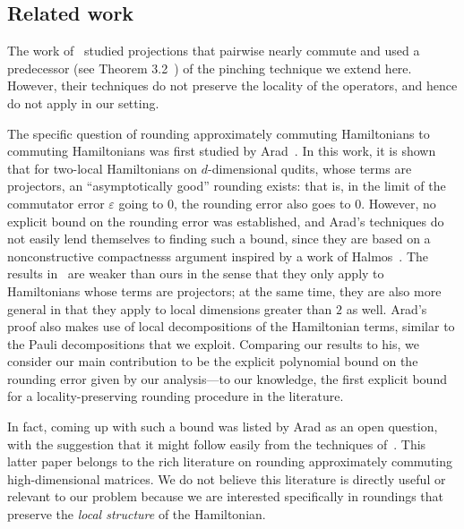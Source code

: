 \documentclass[11pt]{article}
\theoremstyle{plain}
\newcommand{\eps}{\varepsilon}
\begin{document}
\subsection{Related work}
\label{sec:relatedwork}

The work of~\cite{overlapping} studied projections that pairwise nearly commute and used a predecessor (see Theorem 3.2~\cite{overlapping}) of the pinching technique we extend here. However, their techniques do not preserve the locality of the operators, and hence do not apply in our setting.

The specific question of rounding approximately commuting Hamiltonians to commuting Hamiltonians was first studied by Arad~\cite{arad2011notepartialnogotheorem}. In this work, it is shown that for two-local Hamiltonians on $d$-dimensional qudits, whose terms are projectors, an ``asymptotically good'' rounding exists: that is, in the limit of the commutator error $\eps$ going to $0$, the rounding error also goes to $0$.  However, no explicit bound on the rounding error was established, and Arad's techniques do not easily lend themselves to finding such a bound, since they are based on a nonconstructive compactnesss argument inspired by a work of Halmos~\cite{halmos1976some}.
The results in~\cite{arad2011notepartialnogotheorem} are weaker than ours in the sense that they only apply to Hamiltonians whose terms are projectors; at the same time, they are also more general in that they apply to local dimensions greater than $2$ as well.
Arad's proof also makes use of local decompositions of the Hamiltonian terms, similar to the Pauli decompositions that we exploit. Comparing our results to his, we consider our main contribution to be the explicit polynomial bound on the rounding error given by our analysis---to our knowledge, the first explicit bound for a locality-preserving rounding procedure in the literature. 

In fact, coming up with such a bound was listed by Arad as an open question, with the suggestion that it might follow easily from the techniques of~\cite{pearcy1979almost}. This latter paper belongs to the rich literature on rounding approximately commuting high-dimensional matrices. We do not believe this literature is directly useful or relevant to our problem because we are interested specifically in roundings that preserve the \emph{local structure} of the Hamiltonian. 
\end{document}
